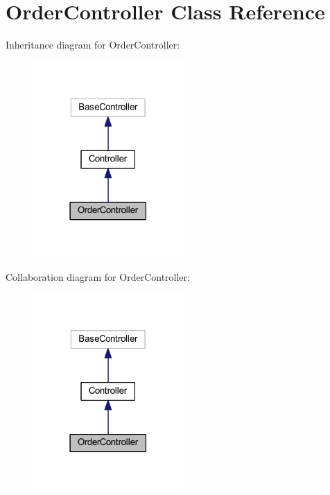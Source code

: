 \hypertarget{class_app_1_1_http_1_1_controllers_1_1_order_controller}{}\section{Order\+Controller Class Reference}
\label{class_app_1_1_http_1_1_controllers_1_1_order_controller}


Inheritance diagram for Order\+Controller\+:
\nopagebreak
\begin{figure}[H]
\begin{center}
\leavevmode
\includegraphics[width=162pt]{class_app_1_1_http_1_1_controllers_1_1_order_controller__inherit__graph}
\end{center}
\end{figure}


Collaboration diagram for Order\+Controller\+:
\nopagebreak
\begin{figure}[H]
\begin{center}
\leavevmode
\includegraphics[width=162pt]{class_app_1_1_http_1_1_controllers_1_1_order_controller__coll__graph}
\end{center}
\end{figure}
